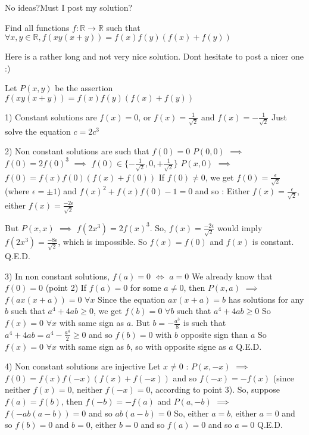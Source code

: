 \begin{solution}
	No ideas?Must I post my solution?
\end{solution}



\begin{solution}
	\begin{tcolorbox}Find all functions $ f: \mathbb{R}\rightarrow \mathbb{R}$ such that $ \forall x,y\in\mathbb{R},f(xy(x + y)) = f(x)f(y)(f(x) + f(y))$\end{tcolorbox}

Here is a rather long and not very nice solution. Dont hesitate to post a nicer one :)

Let $ P(x,y)$ be the assertion $ f(xy(x+y))=f(x)f(y)(f(x)+f(y))$

1) Constant solutions are $ f(x)=0$, or $ f(x)=\frac{1}{\sqrt 2}$ and $ f(x)=-\frac{1}{\sqrt 2}$
Just solve the equation $ c=2c^3$

2) Non constant solutions are such that $ f(0)=0$
$ P(0,0)$ $ \implies$ $ f(0)=2f(0)^3$ $ \implies$ $ f(0)\in\{-\frac{1}{\sqrt 2},0,+\frac{1}{\sqrt 2}\}$
$ P(x,0)$ $ \implies$ $ f(0)=f(x)f(0)(f(x)+f(0))$
If $ f(0)\neq 0$, we get $ f(0)=\frac{\epsilon}{\sqrt 2}$ (where $ \epsilon=\pm 1$) and $ f(x)^2+f(x)f(0)-1=0$ and so :
Either $ f(x)=\frac{\epsilon}{\sqrt 2}$, either $ f(x)=\frac{-2\epsilon}{\sqrt 2}$

But $ P(x,x)$ $ \implies$ $ f(2x^3)=2f(x)^3$. So, $ f(x)=\frac{-2\epsilon}{\sqrt 2}$ would imply $ f(2x^3)=\frac{-8\epsilon}{\sqrt 2}$, which is impossible.
So $ f(x)=f(0)$ and $ f(x)$ is constant.
Q.E.D.

3) In non constant solutions, $ f(a)=0$ $ \iff$ $ a=0$
We already know that $ f(0)=0$ (point 2)
If $ f(a)=0$ for some $ a\neq 0$, then $ P(x,a)$ $ \implies$ $ f(ax(x+a))=0$ $ \forall x$
Since the equation $ ax(x+a)=b$ has solutions for any $ b$ such that $ a^4+4ab\geq 0$, we get $ f(b)=0$ $ \forall b$ such that $ a^4+4ab\geq 0$
So $ f(x)=0$ $ \forall x$ with same sign as $ a$.
But $ b=-\frac{a^3}{8}$ is such that $ a^4+4ab=a^4-\frac{a^4}{2}\geq 0$ and so $ f(b)=0$ with $ b$ opposite sign than $ a$
So $ f(x)=0$ $ \forall x$ with same sign as $ b$, so with opposite signe as $ a$
Q.E.D.

4) Non constant solutions are injective
Let $ x\neq 0$ : $ P(x,-x)$ $ \implies$ $ f(0)=f(x)f(-x)(f(x)+f(-x))$ and so $ f(-x)=-f(x)$ (since neither $ f(x)=0$, neither $ f(-x)=0$, according to point 3).
So, suppose $ f(a)=f(b)$, then $ f(-b)=-f(a)$ and $ P(a,-b)$ $ \implies$ $ f(-ab(a-b))=0$ and so $ ab(a-b)=0$
So, either $ a=b$, either $ a=0$ and so $ f(b)=0$ and $ b=0$, either $ b=0$ and so $ f(a)=0$ and so $ a=0$
Q.E.D.


\end{solution}
